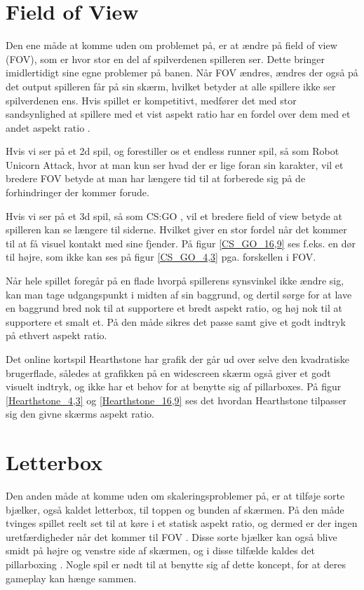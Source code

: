 \documentclass[Main.tex]{AspectRatio.tex}
\begin{document}
\section{Field of View}

Den ene måde at komme uden om problemet på, er at ændre på field of view (FOV), som er hvor stor en del af spilverdenen spilleren ser. Dette bringer imidlertidigt sine egne problemer på banen. Når FOV ændres, ændres der også på det output spilleren får på sin skærm, hvilket betyder at alle spillere ikke ser spilverdenen ens. Hvis spillet er kompetitivt, medfører det med stor sandsynlighed at spillere med et vist aspekt ratio har en fordel over dem med et andet aspekt ratio \cite{Atwood}.

Hvis vi ser på et 2d spil, og forestiller os et endless runner spil, så som Robot Unicorn Attack\cite{RUAGame}, hvor at man kun ser hvad der er lige foran sin karakter, vil et bredere FOV betyde at man har længere tid til at forberede sig på de forhindringer der kommer forude.

Hvis vi ser på et 3d spil, så som CS:GO \cite{CS:GOGame}, vil et bredere field of view betyde at spilleren kan se længere til siderne. Hvilket giver en stor fordel når det kommer til at få visuel kontakt med sine fjender. På figur \ref{CS_GO_16,9} ses f.eks. en dør til højre, som ikke kan ses på figur \ref{CS_GO_4,3} pga. forskellen i FOV.

Når hele spillet foregår på en flade hvorpå spillerens synsvinkel ikke ændre sig, kan man tage udgangspunkt i midten af sin baggrund, og dertil sørge for at lave en baggrund bred nok til at supportere et bredt aspekt ratio, og høj nok til at supportere et smalt et. På den måde sikres det passe samt give et godt indtryk på ethvert aspekt ratio. 

Det online kortspil Hearthstone \cite{HSGame} har grafik der går ud over selve den kvadratiske brugerflade, således at grafikken på en widescreen skærm også giver et godt visuelt indtryk, og ikke har et behov for at benytte sig af pillarboxes. På figur \ref{Hearthstone_4,3} og \ref{Hearthstone_16,9} ses det hvordan Hearthstone tilpasser sig den givne skærms aspekt ratio.

\section{Letterbox}

Den anden måde at komme uden om skaleringsproblemer på, er at tilføje sorte bjælker, også kaldet letterbox, til toppen og bunden af skærmen. På den måde tvinges spillet reelt set til at køre i et statisk aspekt ratio, og dermed er der ingen uretfærdigheder når det kommer til FOV \cite{computerhope}. Disse sorte bjælker kan også blive smidt på højre og venstre side af skærmen, og i disse tilfælde kaldes det pillarboxing \cite{Apple}. Nogle spil er nødt til at benytte sig af dette koncept, for at deres gameplay kan hænge sammen.
\end{document}
